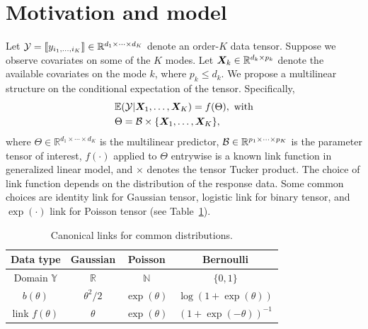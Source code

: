 \documentclass[12pt]{article}
\theoremstyle{plain}
\theoremstyle{definition}
\begin{document}
\section{Motivation and model}\label{sec:model}
Let $\mathcal{Y}=\llbracket y_{i_1,\ldots,i_K} \rrbracket\in\mathbb{R}^{d_1\times \cdots\times d_K}$ denote an order-$K$ data tensor. Suppose we observe covariates on some of the $K$ modes. Let $\bm X_k\in\mathbb{R}^{d_k\times p_k}$ denote the available covariates on the mode $k$, where $p_k\leq d_k$. We propose a multilinear structure on the conditional expectation of the tensor. Specifically, 
\begin{align}\label{eq:tensormodel}
&\mathbb{E}(\mathcal{Y}|\bm X_1,\ldots,\bm X_K)=f(\Theta),\ \text{with}\\
&\Theta =\mathcal{B}\times\{\bm X_1,\ldots,\bm X_K\} ,
\end{align}
where  $\Theta\in\mathbb{R}^{d_1\times \cdots\times d_K}$ is the multilinear predictor, $\mathcal{B}\in\mathbb{R}^{p_1\times \cdots \times p_K}$ is the parameter tensor of interest, $f(\cdot)$ applied to $\Theta$ entrywise is a known link function in generalized linear model, and $\times$ denotes the tensor Tucker product. The choice of link function depends on the distribution of the response data. Some common choices are identity link for Gaussian tensor, logistic link for binary tensor, and $\exp(\cdot)$ link for Poisson tensor (see Table~\ref{table:link}). 


\begin{table}[htb]
\centering
\begin{tabular}{c|ccc}
Data type &Gaussian & Poisson& Bernoulli\\
\hline
Domain $\mathbb{Y}$& $\mathbb{R}$&$\mathbb{N}$&$\{0,1\}$\\
 $b(\theta)$&$\theta^2/2$& $\exp(\theta)$&$\log (1+\exp(\theta))$\\
 link $f(\theta)$&$\theta$&$\exp(\theta)$&$(1+\exp(-\theta))^{-1}$
\end{tabular}
\caption{Canonical links for common distributions.}\label{table:link}
\end{table}
\end{document}
